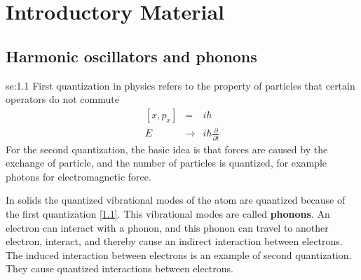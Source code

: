 \chapter{Introductory Material}

\section{Harmonic oscillators and phonons}{se:1.1}
First quantization in physics refers to the property of particles that certain operators do not commute
\begin{eqnarray}
    \left[ x, p_x \right] &=& i\hbar  \label{1.1} \\
    E &\to& i\hbar \frac{\partial}{\partial t}  \label{1.2}
\end{eqnarray}
For the second quantization, the basic idea is that forces are caused by the exchange of particle, and the number of particles is quantized, for example photons for electromagnetic force.

In solids the quantized vibrational modes of the atom are quantized because of the first quantization \eqref{1.1}.
This vibrational modes are called \textbf{phonons}.
An electron can interact with a phonon, and this phonon can travel to another electron, interact, and thereby cause an indirect interaction between electrons.
The induced interaction between electrons is an example of second quantization.
They cause quantized interactions between electrons.

